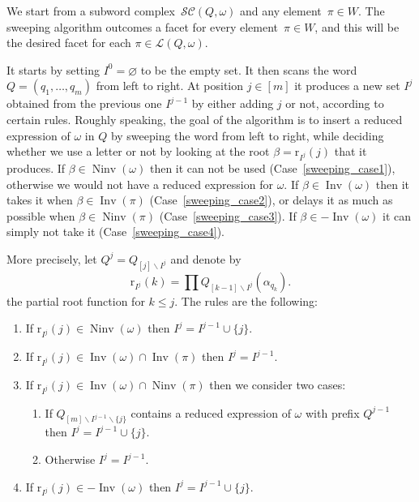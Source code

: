 \documentclass[reqno]{amsart}
\theoremstyle{definition}
\newcommand{\ssm}{\smallsetminus} %
\DeclareMathOperator{\Inv}{Inv} %
\DeclareMathOperator{\Ninv}{Ninv} %
\newcommand{\linearExtensions}{\mathcal{L}} %
\newcommand{\subwordComplex}{\mathcal{SC}} %
\newcommand{\rootFunction}[2]{\mathrm{r}_{#1}(#2)} %
\begin{document}
We start from a subword complex~$\subwordComplex(Q, \omega)$ and any element~$\pi \in W$.
The sweeping algorithm outcomes a facet for every element~$\pi \in W$, and this will be the desired facet for each $\pi \in \linearExtensions(Q,\omega)$.

It starts by setting $I^0=\varnothing$ to be the empty set.
It then scans the word $Q=(q_1,\dots ,q_m)$ from left to right.
At position $j\in [m]$ it produces a new set $I^j$ obtained from the previous one $I^{j-1}$ by either adding $j$ or not, according to certain rules.
Roughly speaking, the goal of the algorithm is to insert a reduced expression of $\omega$ in $Q$ by sweeping the word from left to right, while deciding whether we use a letter or not by looking at the root $\beta=\rootFunction{I^j}{j}$ that it produces.
If $\beta \in \Ninv(\omega)$ then it can not be used (Case~\ref{sweeping_case1}), otherwise we would not have a reduced expression for $\omega$.
If $\beta \in \Inv(\omega)$ then it takes it when $\beta \in \Inv(\pi)$ (Case~\ref{sweeping_case2}), or delays it as much as possible when $\beta \in \Ninv(\pi)$ (Case~\ref{sweeping_case3}).
If $\beta \in -\Inv(\omega)$ it can simply not take it (Case~\ref{sweeping_case4}).

More precisely, let $Q^j=Q_{[j]\ssm I^j}$ and denote by
\[
\rootFunction{I^j}{k} = \prod Q_{[k-1]\ssm I^j}(\alpha_{q_k}).
\]
the partial root function for $k\leq j$.  
The rules are the following:

\begin{enumerate}[{Case} 1:]
    \item If $\rootFunction{I^j}{j}\in \Ninv(\omega)$ then 
    \(
    I^j=I^{j-1}\cup\{j\}.
    \) 
    \label{sweeping_case1}
    \item If $\rootFunction{I^j}{j}\in \Inv(\omega) \cap \Inv(\pi)$ then 
    \(
    I^j=I^{j-1}.
    \)
    \label{sweeping_case2}
    \item If $\rootFunction{I^j}{j}\in \Inv(\omega) \cap \Ninv(\pi)$ then we consider two cases: 
    \label{sweeping_case3} 
    \begin{enumerate}[\hspace{-1cm} (a)]
        \item If $Q_{[m]\ssm I^{j-1}\ssm \{j\}}$ contains a reduced expression of $\omega$ with prefix $Q^{j-1}$ then 
        \(
        {I^j=I^{j-1}\cup \{j\}}.
        \)~
        \label{sweeping_case3a}
        \item Otherwise
        \(
        I^j=I^{j-1}.
        \)
        \label{sweeping_case3b}
    \end{enumerate}
    \item If $\rootFunction{I^j}{j}\in -\Inv(\omega)$ then
    \(
    I^j=I^{j-1}\cup \{j\}.
    \)
    \label{sweeping_case4}
\end{enumerate}
\end{document}
